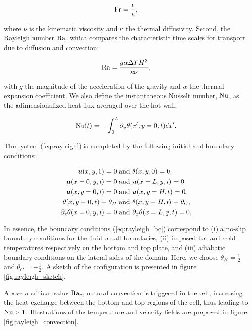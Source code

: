 \begin{equation*}
	\text{Pr} = \frac{\nu}{\kappa},
\end{equation*}

where $\nu$ is the kinematic viscosity and $\kappa$ the thermal diffusivity. Second, the Rayleigh number $\text{Ra}$, which compares the characteristic time scales for transport due to diffusion and convection:

\begin{equation*}
	\text{Ra} = \frac{g \alpha \Delta T H^3}{\kappa \nu},
\end{equation*}

with $g$ the magnitude of the acceleration of the gravity and $\alpha$ the thermal expansion coefficient. We also define the instantaneous Nusselt number, $\text{Nu}$, as the adimensionalized heat flux averaged over the hot wall:

\begin{equation}
\label{eq:nusselt}
	\text{Nu} (t) = - \int_{0}^{L} \partial_y \theta (x',y=0,t) dx'.
\end{equation}

The system (\ref{eq:rayleigh}) is completed by the following initial and boundary conditions:

\begin{equation}
\label{eq:rayleigh_bc}
\begin{split}
	\bm{u}(x,y,0)	= 0 &\text{ and } \theta(x,y,0)	= 0, \\
	\bm{u}(x=0,y,t)	= 0 &\text{ and } \bm{u}(x=L,y,t) = 0, \\
	\bm{u}(x,y=0,t)	= 0 &\text{ and } \bm{u}(x,y=H,t) = 0, \\
	\theta(x,y=0,t) 	= \theta_H &\text{ and } \theta(x,y=H,t) = \theta_C, \\
	\partial_x \theta(x=0,y,t) = 0 &\text{ and } \partial_x \theta(x=L,y,t) = 0,
\end{split}
\end{equation}

In essence, the boundary conditions (\ref{eq:rayleigh_bc}) correspond to (i) a no-slip boundary conditions for the fluid on all boundaries, (ii) imposed hot and cold temperatures respectively on the bottom and top plate, and (iii) adiabatic boundary conditions on the lateral sides of the domain. Here, we choose $\theta_H = \frac{1}{2}$ and $\theta_C = -\frac{1}{2}$. A sketch of the configuration is presented in figure \ref{fig:rayleigh_sketch}.



Above a critical value $\text{Ra}_c$, natural convection is triggered in the cell, increasing the heat exchange between the bottom and top regions of the cell, thus leading to $\text{Nu} > 1$. Illustrations of the temperature and velocity fields are proposed in figure \ref{fig:rayleigh_convection}.

